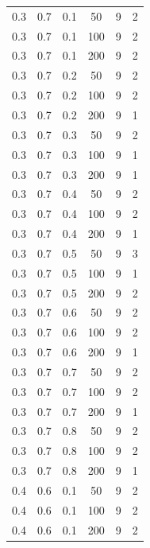 \documentclass[a4paper,14pt, unknownkeysallowed]{extreport}
\begin{document}
\begin{center}
\begin{longtable}[c]{|c|c|c|c|c|c|}
        \hline
         0.3 &  0.7 &  0.1 &   50 &     9 &     2 \\
         0.3 &  0.7 &  0.1 &  100 &     9 &     2 \\
         0.3 &  0.7 &  0.1 &  200 &     9 &     2 \\
        \hline
         0.3 &  0.7 &  0.2 &   50 &     9 &     2 \\
         0.3 &  0.7 &  0.2 &  100 &     9 &     2 \\
         0.3 &  0.7 &  0.2 &  200 &     9 &     1 \\
        \hline
         0.3 &  0.7 &  0.3 &   50 &     9 &     2 \\
         0.3 &  0.7 &  0.3 &  100 &     9 &     1 \\
         0.3 &  0.7 &  0.3 &  200 &     9 &     1 \\
        \hline
         0.3 &  0.7 &  0.4 &   50 &     9 &     2 \\
         0.3 &  0.7 &  0.4 &  100 &     9 &     2 \\
         0.3 &  0.7 &  0.4 &  200 &     9 &     1 \\
        \hline
         0.3 &  0.7 &  0.5 &   50 &     9 &     3 \\
         0.3 &  0.7 &  0.5 &  100 &     9 &     1 \\
         0.3 &  0.7 &  0.5 &  200 &     9 &     2 \\
        \hline
         0.3 &  0.7 &  0.6 &   50 &     9 &     2 \\
         0.3 &  0.7 &  0.6 &  100 &     9 &     2 \\
         0.3 &  0.7 &  0.6 &  200 &     9 &     1 \\
        \hline
         0.3 &  0.7 &  0.7 &   50 &     9 &     2 \\
         0.3 &  0.7 &  0.7 &  100 &     9 &     2 \\
         0.3 &  0.7 &  0.7 &  200 &     9 &     1 \\
        \hline
         0.3 &  0.7 &  0.8 &   50 &     9 &     2 \\
         0.3 &  0.7 &  0.8 &  100 &     9 &     2 \\
         0.3 &  0.7 &  0.8 &  200 &     9 &     1 \\
        \hline
         0.4 &  0.6 &  0.1 &   50 &     9 &     2 \\
         0.4 &  0.6 &  0.1 &  100 &     9 &     2 \\
         0.4 &  0.6 &  0.1 &  200 &     9 &     2 \\

\end{longtable}
\end{center}
\end{document}
